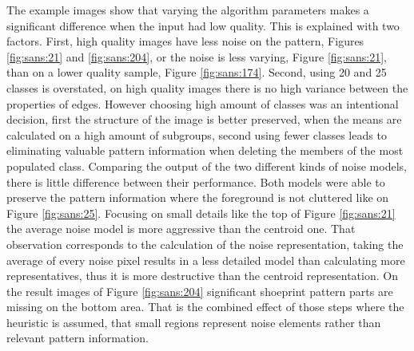 \documentclass[draft,final]{vutinfth} %
\begin{document}
\par
The example images show that varying the algorithm parameters makes a significant difference when the input had low quality.
This is explained with two factors.
First, high quality images have less noise on the pattern, Figures \ref{fig:sans:21} and \ref{fig:sans:204}, or the noise is less varying, Figure \ref{fig:sans:21}, than on a lower quality sample, Figure \ref{fig:sans:174}.
Second, using 20 and 25 classes is overstated, on high quality images there is no high variance between the properties of edges.
However choosing high amount of classes was an intentional decision, first the structure of the image is better preserved, when the means are calculated on a high amount of subgroups, second using fewer classes leads to eliminating valuable pattern information when deleting the members of the most populated class.
Comparing the output of the two different kinds of noise models, there is little difference between their performance.
Both models were able to preserve the pattern information where the foreground is not cluttered like on Figure \ref{fig:sans:25}.
Focusing on small details like the top of Figure \ref{fig:sans:21} the average noise model is more aggressive than the centroid one.
That observation corresponds to the calculation of the noise representation, taking the average of every noise pixel results in a less detailed model than calculating more representatives, thus it is more destructive than the centroid representation.
On the result images of Figure \ref{fig:sans:204} significant shoeprint pattern parts are missing on the bottom area.
That is the combined effect of those steps where the heuristic is assumed, that small regions represent noise elements rather than relevant pattern information.
\end{document}
